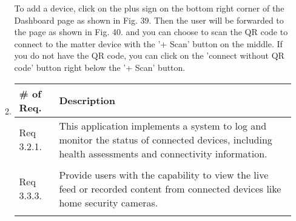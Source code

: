 \begin{enumerate}[label=\arabic*.]
\begin{enumerate}[label=\alph*]
              To add a device, click on the plus sign on the bottom right corner of the Dashboard page as shown in Fig. 39. Then the user will be forwarded to the page as shown in Fig. 40. and you can choose to scan the QR code to connect to the matter device with the '+ Scan' button on the middle. If you do not have the QR code, you can click on the 'connect without QR code' button right below the '+ Scan' button. \\
              \item 
              \begin{table}[H]
                        \center
                        \begin{tabular}{m{1.4cm} m{5.5cm}}
                            \toprule
                            \# of Req. & Description                                                                                                                   \\
                            \midrule
                            Req 3.2.1.   & This application implements a system to log and monitor the status of connected devices, including health assessments and connectivity information. \\\\
                            Req 3.3.3.   & Provide users with the capability to view the live feed or recorded content from connected devices like home security cameras.                     \\\\
                            \bottomrule
                        \end{tabular}
                    \end{table}
                

\end{enumerate}
\end{enumerate}
